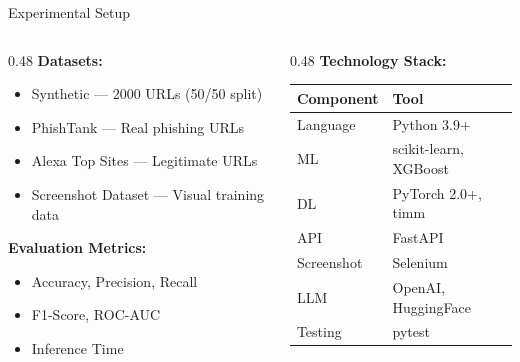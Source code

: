 \documentclass[aspectratio=169,12pt]{beamer}
\begin{document}
\begin{frame}{Experimental Setup}
    \begin{columns}[T]
        \begin{column}{0.48\textwidth}
            \textbf{Datasets:}
            \begin{itemize}
                \item Synthetic --- 2000 URLs (50/50 split)
                \item PhishTank --- Real phishing URLs
                \item Alexa Top Sites --- Legitimate URLs
                \item Screenshot Dataset --- Visual training data
            \end{itemize}
            \vspace{0.3cm}
            \textbf{Evaluation Metrics:}
            \begin{itemize}
                \item Accuracy, Precision, Recall
                \item F1-Score, ROC-AUC
                \item Inference Time
            \end{itemize}
        \end{column}
        \begin{column}{0.48\textwidth}
            \textbf{Technology Stack:}
            \small
            \begin{tabular}{ll}
                \toprule
                \textbf{Component} & \textbf{Tool} \\
                \midrule
                Language & Python 3.9+ \\
                ML & scikit-learn, XGBoost \\
                DL & PyTorch 2.0+, timm \\
                API & FastAPI \\
                Screenshot & Selenium \\
                LLM & OpenAI, HuggingFace \\
                Testing & pytest \\
                \bottomrule
            \end{tabular}
        \end{column}
    \end{columns}
\end{frame}
\end{document}
